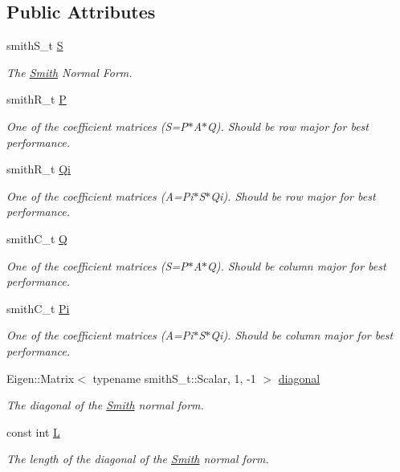 \subsection*{Public Attributes}
\begin{DoxyCompactItemize}
\item 
smith\+S\+\_\+t \hyperlink{classMackey_1_1Smith_a676606c4002b08a37f0ea11dc3686dbe}{S}
\begin{DoxyCompactList}\small\item\em The \hyperlink{classMackey_1_1Smith}{Smith} Normal Form. \end{DoxyCompactList}\item 
smith\+R\+\_\+t \hyperlink{classMackey_1_1Smith_a5a831316edd85dedc7394b39fda103a2}{P}
\begin{DoxyCompactList}\small\item\em One of the coefficient matrices (S=P$\ast$\+A$\ast$Q). Should be row major for best performance. \end{DoxyCompactList}\item 
smith\+R\+\_\+t \hyperlink{classMackey_1_1Smith_ade9f9fbe25629c7e20bc9cfe69ee91ad}{Qi}
\begin{DoxyCompactList}\small\item\em One of the coefficient matrices (A=Pi$\ast$\+S$\ast$\+Qi). Should be row major for best performance. \end{DoxyCompactList}\item 
smith\+C\+\_\+t \hyperlink{classMackey_1_1Smith_af93f16dfd0ce77406d9696a026092306}{Q}
\begin{DoxyCompactList}\small\item\em One of the coefficient matrices (S=P$\ast$\+A$\ast$Q). Should be column major for best performance. \end{DoxyCompactList}\item 
smith\+C\+\_\+t \hyperlink{classMackey_1_1Smith_a97f16eca1aa9f4f6c36c2680fdcf277e}{Pi}
\begin{DoxyCompactList}\small\item\em One of the coefficient matrices (A=Pi$\ast$\+S$\ast$\+Qi). Should be column major for best performance. \end{DoxyCompactList}\item 
Eigen\+::\+Matrix$<$ typename smith\+S\+\_\+t\+::\+Scalar, 1, -\/1 $>$ \hyperlink{classMackey_1_1Smith_a5cd4750403fb58647adb6eaa42580e3c}{diagonal}
\begin{DoxyCompactList}\small\item\em The diagonal of the \hyperlink{classMackey_1_1Smith}{Smith} normal form. \end{DoxyCompactList}\item 
const int \hyperlink{classMackey_1_1Smith_a02ea735836a4a70f504e360495b0e1e1}{L}
\begin{DoxyCompactList}\small\item\em The length of the diagonal of the \hyperlink{classMackey_1_1Smith}{Smith} normal form. \end{DoxyCompactList}\end{DoxyCompactItemize}


